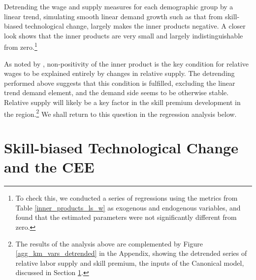 \documentclass[11pt]{article}
\begin{document}
Detrending the wage and supply measures for each demographic group by a linear trend, simulating smooth linear demand growth such as that from skill-biased technological change, largely makes the inner products negative. A closer look shows that the inner products are very small and largely indistinguishable from zero.\footnote{To check this, we conducted a series of regressions using the metrics from Table \ref{inner_products_ls_w} as exogenous and endogenous variables, and found that the estimated parameters were not significantly different from zero.}

As noted by \citeauthor{katz1992changes}, non-positivity of the inner product is the key condition for relative wages to be explained entirely by changes in relative supply. The detrending performed above suggests that this condition is fulfilled, excluding the linear trend demand element, and the demand side seems to be otherwise stable. Relative supply will likely be a key factor in the skill premium development in the region.\footnote{The results of the analysis above are complemented by Figure \ref{agg_km_vars_detrended} in the Appendix, showing the detrended series of relative labor supply and skill premium, the inputs of the Canonical model, discussed in Section \ref{skill_bias_cee}.} We shall return to this question in the regression analysis below.






\section{Skill-biased Technological Change and the CEE}\label{skill_bias_cee}
\end{document}
